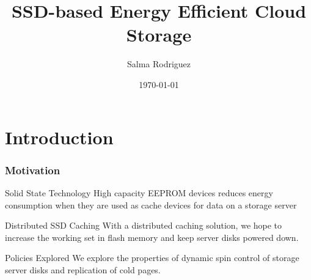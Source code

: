 \documentclass{beamer}
\title[Florida International University]{SSD-based Energy Efficient Cloud Storage}
\author{Salma Rodriguez}
\institute[University] {
Florida International University \\
\medskip
{\emph{srodr063@fiu.edu}}}
\date{\today}
\begin{document}
%
\section{Introduction}
%
\begin{frame}
\titlepage
\end{frame}
%
\begin{frame}
\frametitle{Motivation}
\begin{block}
{Solid State Technology}
High capacity EEPROM devices
reduces energy consumption when they are used
as cache devices for data on a storage server
\end{block}
\begin{block}
{Distributed SSD Caching}
With a distributed caching solution, we hope to increase
the working set in flash memory and keep server disks powered down.
\end{block}
\begin{block}
{Policies Explored}
We explore the properties of dynamic spin control of storage
server disks and replication of cold pages.
\end{block}
\end{frame}
%
\end{document}
